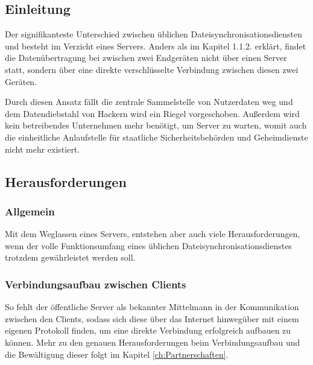 \subsection{Einleitung}
Der signifikanteste Unterschied zwischen üblichen Dateisynchronisationsdiensten
und \sblit besteht im Verzicht eines Servers. Anders als im Kapitel 1.1.2. erklärt,
findet die Datenübertragung bei \sblit zwischen zwei Endgeräten nicht über einen Server statt,
sondern über eine direkte verschlüsselte Verbindung zwischen diesen zwei Geräten.

Durch diesen Ansatz fällt die zentrale Sammelstelle von Nutzerdaten
weg und dem Datendiebstahl von Hackern wird ein Riegel vorgeschoben. Außerdem
wird kein betreibendes Unternehmen mehr benötigt, um Server zu warten, womit auch
die einheitliche Anlaufstelle für staatliche Sicherheitsbehörden und Geheimdienste
nicht mehr existiert.

\subsection{Herausforderungen}
\subsubsection{Allgemein}
Mit dem Weglassen eines Servers, entstehen aber auch viele Herausforderungen,
wenn der volle Funktionsumfang eines üblichen Dateisynchronisationsdienstes
trotzdem gewährleistet werden soll.

\subsubsection{Verbindungsaufbau zwischen Clients}
So fehlt der öffentliche Server als bekannter \glqq{} Mittelmann \grqq{} in der Kommunikation
zwischen den Clients, sodass sich diese über das Internet hinwegüber mit einem
eigenen Protokoll finden, um eine direkte Verbindung erfolgreich aufbauen zu können.
Mehr zu den genauen Herausforderungen beim Verbindungsaufbau und
die Bewältigung dieser folgt im Kapitel \ref{ch:Partnerschaften}.

